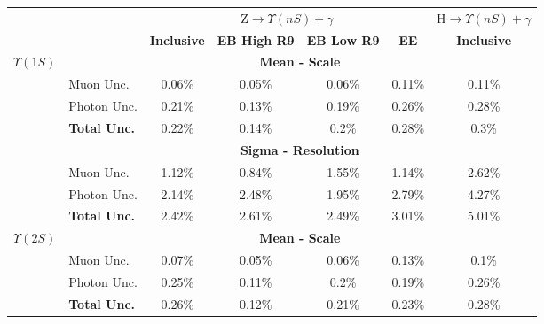 

\begin{tabular}{cl|c|c|c|c|c|}
\cline{3-7}
\multicolumn{1}{l}{}                      &      & \multicolumn{4}{c|}{Z$\rightarrow \Upsilon(nS) + \gamma$} & H$\rightarrow \Upsilon(nS) + \gamma$ \\ \cline{3-7}
\multicolumn{1}{l}{}                      &                     & \textbf{Inclusive}  & \textbf{EB High R9}  & \textbf{EB Low R9}  & \textbf{EE} & \textbf{Inclusive}        \\ \hline


\multicolumn{1}{|c|}{\multirow{8}{*}{$\Upsilon(1S)$}} & \multicolumn{6}{c|}{\textbf{Mean - Scale}} \\ \cline{2-7}
\multicolumn{1}{|c|}{}                    & Muon Unc.           & 0.06\% & 0.05\% & 0.06\% & 0.11\% & 0.11\% \\ \cline{2-7}
\multicolumn{1}{|c|}{}                    & Photon Unc.         & 0.21\% & 0.13\% & 0.19\% & 0.26\% & 0.28\% \\ \cline{2-7}
\multicolumn{1}{|c|}{}                    & \textbf{Total Unc.} & 0.22\% & 0.14\% & 0.2\% & 0.28\% & 0.3\% \\ \cline{2-7} 


\multicolumn{1}{|c|}{}                    & \multicolumn{6}{c|}{\textbf{Sigma - Resolution}}            \\ \cline{2-7}
\multicolumn{1}{|c|}{}                    & Muon Unc.           & 1.12\% & 0.84\% & 1.55\% & 1.14\% & 2.62\% \\ \cline{2-7}
\multicolumn{1}{|c|}{}                    & Photon Unc.         & 2.14\% & 2.48\% & 1.95\% & 2.79\% & 4.27\% \\ \cline{2-7}
\multicolumn{1}{|c|}{}                    & \textbf{Total Unc.} & 2.42\% & 2.61\% & 2.49\% & 3.01\% & 5.01\% \\ \hline \hline 



\multicolumn{1}{|c|}{\multirow{8}{*}{$\Upsilon(2S)$}} & \multicolumn{6}{c|}{\textbf{Mean - Scale}} \\ \cline{2-7}
\multicolumn{1}{|c|}{}                    & Muon Unc.           & 0.07\% & 0.05\% & 0.06\% & 0.13\% & 0.1\% \\ \cline{2-7}
\multicolumn{1}{|c|}{}                    & Photon Unc.         & 0.25\% & 0.11\% & 0.2\% & 0.19\% & 0.26\% \\ \cline{2-7}
\multicolumn{1}{|c|}{}                    & \textbf{Total Unc.} & 0.26\% & 0.12\% & 0.21\% & 0.23\% & 0.28\% \\ \cline{2-7} 



\end{tabular}
